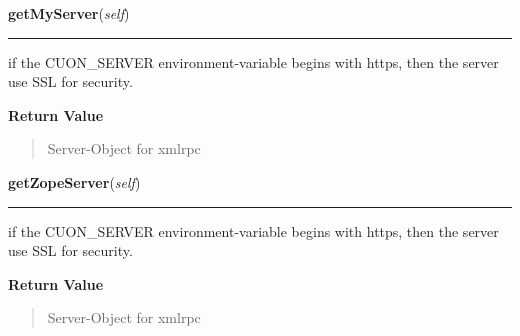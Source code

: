    \label{cuon:XMLRPC:xmlrpc:myXmlRpc:getMyServer}

    \vspace{0.5ex}

\hspace{.8\funcindent}\begin{boxedminipage}{\funcwidth}

    \raggedright \textbf{getMyServer}(\textit{self})

    \vspace{-1.5ex}

    \rule{\textwidth}{0.5\fboxrule}
\setlength{\parskip}{2ex}
    if the CUON\_SERVER environment-variable begins with https, then the 
    server use SSL for security.

\setlength{\parskip}{1ex}
      \textbf{Return Value}
    \vspace{-1ex}

      \begin{quote}
      Server-Object for xmlrpc

      \end{quote}

    \end{boxedminipage}

    \label{cuon:XMLRPC:xmlrpc:myXmlRpc:getZopeServer}

    \vspace{0.5ex}

\hspace{.8\funcindent}\begin{boxedminipage}{\funcwidth}

    \raggedright \textbf{getZopeServer}(\textit{self})

    \vspace{-1.5ex}

    \rule{\textwidth}{0.5\fboxrule}
\setlength{\parskip}{2ex}
    if the CUON\_SERVER environment-variable begins with https, then the 
    server use SSL for security.

\setlength{\parskip}{1ex}
      \textbf{Return Value}
    \vspace{-1ex}

      \begin{quote}
      Server-Object for xmlrpc

      \end{quote}

    \end{boxedminipage}

